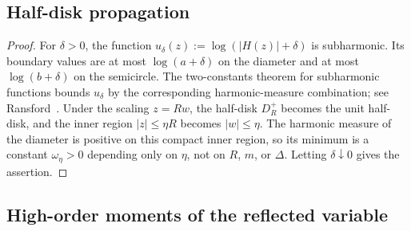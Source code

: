 \subsection{Half-disk propagation}


\begin{proof}
For $\delta>0$, the function $u_\delta(z):=\log(|H(z)|+\delta)$ is subharmonic. Its boundary values are at most $\log(a+\delta)$ on the diameter and at most $\log(b+\delta)$ on the semicircle. The two-constants theorem for subharmonic functions bounds $u_\delta$ by the corresponding harmonic-measure combination; see Ransford~\cite{Ransford1995}. Under the scaling $z=Rw$, the half-disk $D_R^+$ becomes the unit half-disk, and the inner region $|z|\le\eta R$ becomes $|w|\le\eta$. The harmonic measure of the diameter is positive on this compact inner region, so its minimum is a constant $\omega_\eta>0$ depending only on $\eta$, not on $R$, $m$, or $\Delta$. Letting $\delta\downarrow0$ gives the assertion.
\end{proof}

\subsection{High-order moments of the reflected variable}


